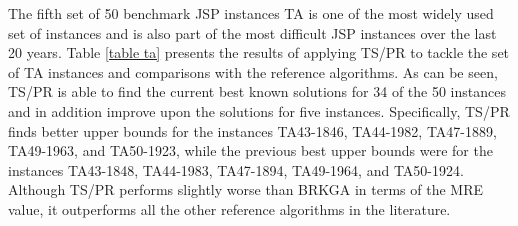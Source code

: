 \documentclass[authoryear,12pt]{elsarticle}
\begin{document}
The fifth set of 50 benchmark JSP instances TA is one of the most widely used set of instances and is also part of the most difficult JSP instances over the last 20 years.
Table \ref{table ta} presents the results of applying TS/PR to tackle the set of TA instances and comparisons with the reference algorithms. As can be seen, TS/PR is able to find the current best known solutions for 34 of the 50 instances and in addition improve upon the solutions for five instances. Specifically, TS/PR finds better upper bounds for the instances TA43-1846, TA44-1982, TA47-1889, TA49-1963, and TA50-1923, while the previous best upper bounds were for the instances TA43-1848, TA44-1983, TA47-1894, TA49-1964, and TA50-1924. Although TS/PR performs slightly worse than BRKGA in terms of the MRE value, it outperforms all the other reference algorithms in the literature.
\end{document}
